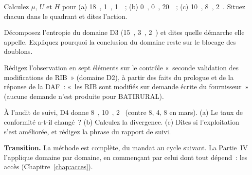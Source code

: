 \begin{boxexo}[title={\ding{45}\quad Exercice~8.1. Calculer et situer \niveaubase}]
Calculez $\mu$, $U$ et $H$ pour (a) 18~\OUI{}, 1~\NON{}, 1~\NEK{}~; (b)
0~\OUI{}, 0~\NON{}, 20~\NEK{}~; (c) 10~\OUI{}, 8~\NON{}, 2~\NEK{}. Situez
chacun dans le quadrant et dites l'action.
\end{boxexo}

\begin{boxexo}[title={\ding{45}\quad Exercice~8.2. Ignorance ou désaccord~? \niveaumoyen}]
Décomposez l'entropie du domaine D3 (15~\OUI{}, 3~\NON{}, 2~\NEK{}) et
dites quelle démarche elle appelle. Expliquez pourquoi la conclusion du
domaine reste \NON{} sur le blocage des doublons.
\end{boxexo}

\begin{boxexo}[title={\ding{45}\quad Exercice~8.3. L'observation \niveaumoyen}]
Rédigez l'observation en sept éléments sur le contrôle «~seconde validation
des modifications de RIB~» (domaine D2), à partir des faits du prologue et
de la réponse de la DAF~: «~les RIB sont modifiés sur demande écrite du
fournisseur~» (aucune demande n'est produite pour BATIRURAL).
\end{boxexo}

\begin{boxexo}[title={\ding{45}\quad Exercice~8.4. Deux cycles \niveauexpert}]
À l'audit de suivi, D4 donne 8~\OUI{}, 10~\NON{}, 2~\NEK{} (contre 8, 4, 8
en mars). (a) Le taux de conformité a-t-il changé~? (b) Calculez la
divergence. (c) Dites si l'exploitation s'est améliorée, et rédigez la
phrase du rapport de suivi.
\end{boxexo}

\begin{boxinfo}
\textbf{Transition.} La méthode est complète, du mandat au cycle suivant. La
Partie~IV l'applique domaine par domaine, en commençant par celui dont tout
dépend~: les accès (Chapitre~\ref{chap:acces}).
\end{boxinfo}
